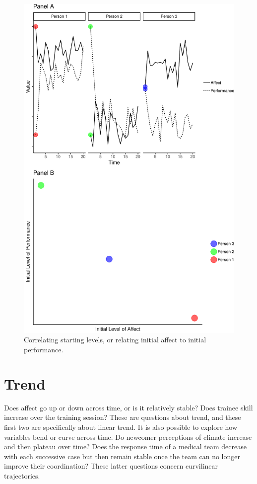 \documentclass[english,,man]{apa6}
\theoremstyle{definition}
\theoremstyle{definition}
\theoremstyle{definition}
\theoremstyle{remark}
\begin{document}
\begin{figure}
\centering
\includegraphics{figures/unnamed-chunk-10-1.pdf}
\caption{\label{fig:unnamed-chunk-10}Correlating starting levels, or
relating initial affect to initial performance.\label{level_correlate}}
\end{figure}

\hypertarget{trend}{%
\section{Trend}\label{trend}}

Does affect go up or down across time, or is it relatively stable? Does
trainee skill increase over the training session? These are questions
about trend, and these first two are specifically about linear trend. It
is also possible to explore how variables bend or curve across time. Do
newcomer perceptions of climate increase and then plateau over time?
Does the response time of a medical team decrease with each successive
case but then remain stable once the team can no longer improve their
coordination? These latter questions concern curvilinear trajectories.
\end{document}

